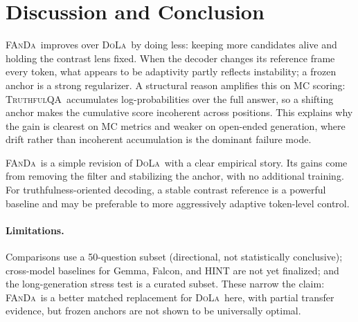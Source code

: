 \documentclass[10pt,twocolumn,letterpaper]{article}
\newcommand{\fanda}{\textsc{FAnDa}}
\newcommand{\dola}{\textsc{DoLa}}
\newcommand{\truthfulqa}{\textsc{TruthfulQA}}
\begin{document}
\section{Discussion and Conclusion}
\fanda\ improves over \dola\ by doing less: keeping more candidates alive and holding the contrast lens fixed. When the decoder changes its reference frame every token, what appears to be adaptivity partly reflects instability; a frozen anchor is a strong regularizer. A structural reason amplifies this on MC scoring: \truthfulqa\ accumulates log-probabilities over the full answer, so a shifting anchor makes the cumulative score incoherent across positions. This explains why the gain is clearest on MC metrics and weaker on open-ended generation, where drift rather than incoherent accumulation is the dominant failure mode.

\fanda\ is a simple revision of \dola\ with a clear empirical story. Its gains come from removing the filter and stabilizing the anchor, with no additional training. For truthfulness-oriented decoding, a stable contrast reference is a powerful baseline and may be preferable to more aggressively adaptive token-level control.

\paragraph{Limitations.} Comparisons use a 50-question subset (directional, not statistically conclusive); cross-model baselines for Gemma, Falcon, and HINT are not yet finalized; and the long-generation stress test is a curated subset. These narrow the claim: \fanda\ is a better matched replacement for \dola\ here, with partial transfer evidence, but frozen anchors are not shown to be universally optimal.

{\small


}
\end{document}
